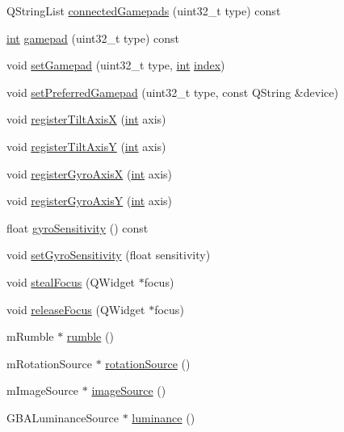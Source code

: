 \begin{DoxyCompactItemize}
Q\+String\+List \mbox{\hyperlink{class_q_g_b_a_1_1_input_controller_ac54e10c00a8dcf3b8687a59a736b2fac}{connected\+Gamepads}} (uint32\+\_\+t type) const
\item 
\mbox{\hyperlink{ioapi_8h_a787fa3cf048117ba7123753c1e74fcd6}{int}} \mbox{\hyperlink{class_q_g_b_a_1_1_input_controller_a94c559c9cd8c9af39a4382079f0e8b95}{gamepad}} (uint32\+\_\+t type) const
\item 
void \mbox{\hyperlink{class_q_g_b_a_1_1_input_controller_a6ee11725ccde4c1b61320e891a019772}{set\+Gamepad}} (uint32\+\_\+t type, \mbox{\hyperlink{ioapi_8h_a787fa3cf048117ba7123753c1e74fcd6}{int}} \mbox{\hyperlink{isa-lr35902_8c_ac9ee548085af12859cb52a6c757cf73a}{index}})
\item 
void \mbox{\hyperlink{class_q_g_b_a_1_1_input_controller_af97b15453bd2259d7faa448995ae1c1a}{set\+Preferred\+Gamepad}} (uint32\+\_\+t type, const Q\+String \&device)
\item 
void \mbox{\hyperlink{class_q_g_b_a_1_1_input_controller_a0938dad12d333efcc9c3e310c0abbea2}{register\+Tilt\+AxisX}} (\mbox{\hyperlink{ioapi_8h_a787fa3cf048117ba7123753c1e74fcd6}{int}} axis)
\item 
void \mbox{\hyperlink{class_q_g_b_a_1_1_input_controller_a25e2e4bde89acb77fcf662794f92d12d}{register\+Tilt\+AxisY}} (\mbox{\hyperlink{ioapi_8h_a787fa3cf048117ba7123753c1e74fcd6}{int}} axis)
\item 
void \mbox{\hyperlink{class_q_g_b_a_1_1_input_controller_a99f4ccb37018985d45dcf79204cd3131}{register\+Gyro\+AxisX}} (\mbox{\hyperlink{ioapi_8h_a787fa3cf048117ba7123753c1e74fcd6}{int}} axis)
\item 
void \mbox{\hyperlink{class_q_g_b_a_1_1_input_controller_adc9962bbbe805ca7bfe72d73c39e4080}{register\+Gyro\+AxisY}} (\mbox{\hyperlink{ioapi_8h_a787fa3cf048117ba7123753c1e74fcd6}{int}} axis)
\item 
float \mbox{\hyperlink{class_q_g_b_a_1_1_input_controller_af61ebb5bca73dca53b40eadf12947ade}{gyro\+Sensitivity}} () const
\item 
void \mbox{\hyperlink{class_q_g_b_a_1_1_input_controller_a41ba2b4efa8962b2b38d1d2fde889033}{set\+Gyro\+Sensitivity}} (float sensitivity)
\item 
void \mbox{\hyperlink{class_q_g_b_a_1_1_input_controller_a353b5eb540cb42cca70e50adb41db9f1}{steal\+Focus}} (Q\+Widget $\ast$focus)
\item 
void \mbox{\hyperlink{class_q_g_b_a_1_1_input_controller_a45623e9ffa5626156b6f581de78f082f}{release\+Focus}} (Q\+Widget $\ast$focus)
\item 
m\+Rumble $\ast$ \mbox{\hyperlink{class_q_g_b_a_1_1_input_controller_a178e6dee0c72e0aa7fc5c10d48541703}{rumble}} ()
\item 
m\+Rotation\+Source $\ast$ \mbox{\hyperlink{class_q_g_b_a_1_1_input_controller_add8a230375dbbc40f02ed514962f5afd}{rotation\+Source}} ()
\item 
m\+Image\+Source $\ast$ \mbox{\hyperlink{class_q_g_b_a_1_1_input_controller_a6147d43ba78ebdce790666ab74922ba3}{image\+Source}} ()
\item 
G\+B\+A\+Luminance\+Source $\ast$ \mbox{\hyperlink{class_q_g_b_a_1_1_input_controller_a0d11486244b97b4581f651b212bcdbc5}{luminance}} ()
\end{DoxyCompactItemize}
